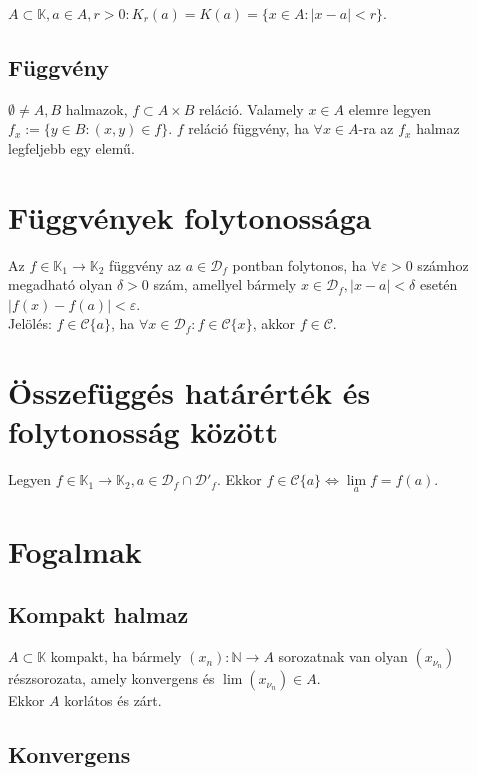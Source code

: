\documentclass[margin=0px]{article}
\begin{document}
$A \subset \mathbb{K}, a \in A, r > 0: K_{r}(a) = K(a) = \{x \in A: |x-a| < r\}$.

\subsection{Függvény}

$\emptyset \neq A, B$ halmazok, $f \subset A \times B$ reláció. Valamely $x \in A$ elemre legyen $f_{x} := \{y \in B: (x,y) \in f\}$. $f$ reláció függvény, ha $\forall x \in A$-ra az $f_{x}$ halmaz legfeljebb egy elemű.

\section{Függvények folytonossága}

Az $f \in \mathbb{K}_{1} \to \mathbb{K}_{2}$ függvény az $a \in \mathcal{D}_{f}$ pontban folytonos, ha $\forall \varepsilon > 0$ számhoz megadható olyan $\delta > 0$ szám, amellyel bármely $x \in \mathcal{D}_{f}, |x-a| < \delta$ esetén $|f(x)-f(a)| < \varepsilon$. \\
Jelölés: $f \in \mathcal{C}\{a\}$, ha $\forall x \in \mathcal{D}_{f} : f \in \mathcal{C}\{x\}$, akkor $f \in \mathcal{C}$.

\section{Összefüggés határérték és folytonosság között}

Legyen $f \in \mathbb{K}_{1} \to \mathbb{K}_{2}, a \in \mathcal{D}_{f} \cap \mathcal{D}'_{f}$. Ekkor $f \in \mathcal{C}\{a\} \iff \lim\limits_{a}{f} = f(a)$.

\section{Fogalmak}

\subsection{Kompakt halmaz}

$A \subset \mathbb{K}$ kompakt, ha bármely $(x_{n}): \mathbb{N} \to A$ sorozatnak van olyan $(x_{\nu_{n}})$ részsorozata, amely konvergens és $\lim{(x_{\nu_{n}})} \in A$. \\
Ekkor $A$ korlátos és zárt.

\subsection{Konvergens}
\end{document}
